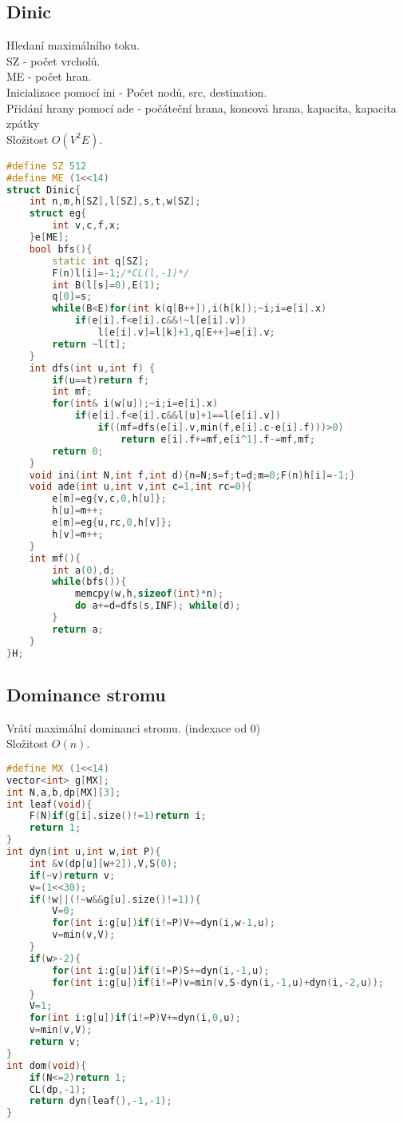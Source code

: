 \documentclass[11pt]{article}
\begin{document}
\subsection{Dinic}
Hledaní maximálního toku.
\\\textsf{SZ} - počet vrcholů.
\\\textsf{ME} - počet hran.
\\Inicializace pomocí ini - Počet nodů, src, destination.
\\Přidání hrany pomocí ade - počáteční hrana, koncová hrana, kapacita, kapacita zpátky
\\Složitost $O(V^2E)$.
\begin{lstlisting}[language=C++]
#define SZ 512
#define ME (1<<14)
struct Dinic{
    int n,m,h[SZ],l[SZ],s,t,w[SZ];
    struct eg{
        int v,c,f,x;
    }e[ME];
    bool bfs(){
        static int q[SZ];
        F(n)l[i]=-1;/*CL(l,-1)*/
        int B(l[s]=0),E(1);
        q[0]=s;
        while(B<E)for(int k(q[B++]),i(h[k]);~i;i=e[i].x)
            if(e[i].f<e[i].c&&!~l[e[i].v])
                l[e[i].v]=l[k]+1,q[E++]=e[i].v;
        return ~l[t];
    }
    int dfs(int u,int f) {
        if(u==t)return f;
        int mf;
        for(int& i(w[u]);~i;i=e[i].x)
            if(e[i].f<e[i].c&&l[u]+1==l[e[i].v])
                if((mf=dfs(e[i].v,min(f,e[i].c-e[i].f)))>0)
                    return e[i].f+=mf,e[i^1].f-=mf,mf;
        return 0;
    }
    void ini(int N,int f,int d){n=N;s=f;t=d;m=0;F(n)h[i]=-1;}
    void ade(int u,int v,int c=1,int rc=0){
        e[m]=eg{v,c,0,h[u]};
        h[u]=m++;
        e[m]=eg{u,rc,0,h[v]};
        h[v]=m++;
    }
    int mf(){
        int a(0),d;
        while(bfs()){
            memcpy(w,h,sizeof(int)*n);
            do a+=d=dfs(s,INF); while(d);
        }
        return a;
    }
}H;
\end{lstlisting}
\subsection{Dominance stromu}
Vrátí maximální dominanci stromu. (indexace od 0)
\\Složitost $O(n)$.
\begin{lstlisting}[language=C++]
#define MX (1<<14)
vector<int> g[MX];
int N,a,b,dp[MX][3];
int leaf(void){
    F(N)if(g[i].size()!=1)return i;
    return 1;
}
int dyn(int u,int w,int P){
    int &v(dp[u][w+2]),V,S(0);
    if(~v)return v;
    v=(1<<30);
    if(!w||(!~w&&g[u].size()!=1)){
        V=0;
        for(int i:g[u])if(i!=P)V+=dyn(i,w-1,u);
        v=min(v,V);
    }
    if(w>-2){
        for(int i:g[u])if(i!=P)S+=dyn(i,-1,u);
        for(int i:g[u])if(i!=P)v=min(v,S-dyn(i,-1,u)+dyn(i,-2,u));
    }
    V=1;
    for(int i:g[u])if(i!=P)V+=dyn(i,0,u);
    v=min(v,V);
    return v;
}
int dom(void){
    if(N<=2)return 1;
    CL(dp,-1);
    return dyn(leaf(),-1,-1);
}
\end{lstlisting}
\end{document}
